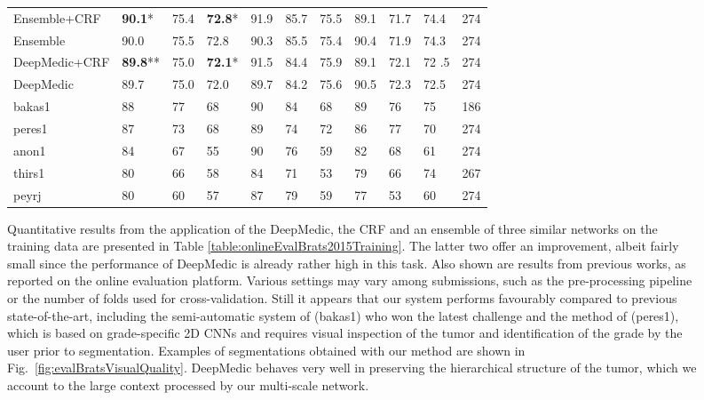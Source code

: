 \documentclass[preprint,authoryear,12pt]{elsarticle}
\begin{document}
\begin{figure}[h]
\begin{table}[!h]
\begin{tabular}{@{}lllllllllll@{}}
Ensemble+CRF		& \textbf{90.1}*	&75.4	& \textbf{72.8}*	& 91.9	& 85.7	& 75.5	& 89.1	& 71.7	& 74.4	&274 \\
Ensemble			& 90.0			&75.5	& 72.8			& 90.3	& 85.5	& 75.4	& 90.4	& 71.9	& 74.3	&274 \\
DeepMedic+CRF	& \textbf{89.8}**&75.0	& \textbf{72.1}*	& 91.5	& 84.4	& 75.9	& 89.1	& 72.1	& 72	.5	&274 \\
DeepMedic		& 89.7			& 75.0	& 72.0			& 89.7	& 84.2	& 75.6	& 90.5	& 72.3	& 72.5	&274 \\

bakas1		 	& 88				& 77		& 68				& 90		& 84		& 68		& 89		& 76		& 75		&186\\
peres1		 	& 87				& 73		& 68				& 89		& 74		& 72		& 86		& 77		& 70		&274\\
anon1		 	& 84				& 67		& 55				& 90		& 76		& 59		& 82		& 68		& 61		&274\\
thirs1		 	& 80				& 66		& 58				& 84		& 71		& 53 	& 79		& 66		& 74		&267\\
peyrj			& 80				& 60		& 57				& 87		& 79		& 59		& 77		& 53		& 60		&274\\
\bottomrule
\end{tabular}
\end{table}

Quantitative results from the application of the DeepMedic, the CRF and an ensemble of three similar networks on the training data are presented in Table \ref{table:onlineEvalBrats2015Training}. The latter two offer an improvement, albeit fairly small since the performance of DeepMedic is already rather high in this task. Also shown are results from previous works, as reported on the online evaluation platform. Various settings may vary among submissions, such as the pre-processing pipeline or the number of folds used for cross-validation. Still it appears that our system performs favourably compared to previous state-of-the-art, including the semi-automatic system of \cite{bakas2015Brats} (bakas1) who won the latest challenge and the method of \cite{pereira2015Brats} (peres1), which is based on grade-specific 2D CNNs and requires visual inspection of the tumor and identification of the grade by the user prior to segmentation. Examples of segmentations obtained with our method are shown in Fig.~\ref{fig:evalBratsVisualQuality}. DeepMedic behaves very well in preserving the hierarchical structure of the tumor, which we account to the large context processed by our multi-scale network.




\end{figure}
\end{document}
